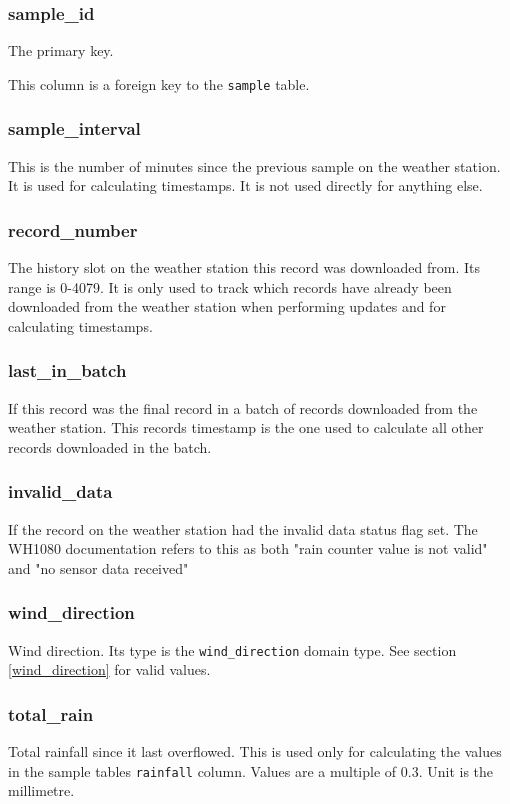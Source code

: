 \documentclass[a4paper,10pt]{book}
\begin{document}
\subsubsection{sample\_id}
The primary key.

This column is a foreign key to the \verb|sample| table.

\subsubsection{sample\_interval}
This is the number of minutes since the previous sample on the weather station. It is used for calculating timestamps. It is not used directly for anything else.

\subsubsection{record\_number}
The history slot on the weather station this record was downloaded from. Its range is 0-4079. It is only used to track which records have already been downloaded from the weather station when performing updates and for calculating timestamps.

\subsubsection{last\_in\_batch}
If this record was the final record in a batch of records downloaded from the weather station. This records timestamp is the one used to calculate all other records downloaded in the batch.

\subsubsection{invalid\_data}
If the record on the weather station had the invalid data status flag set. The WH1080 documentation refers to this as both "rain counter value is not valid" and "no sensor data received"

\subsubsection{wind\_direction}
Wind direction. Its type is the \verb|wind_direction| domain type. See section \ref{wind_direction} for valid values.

\subsubsection{total\_rain}
Total rainfall since it last overflowed. This is used only for calculating the values in the sample tables \verb|rainfall| column. Values are a multiple of 0.3. Unit is the millimetre. 
\end{document}
